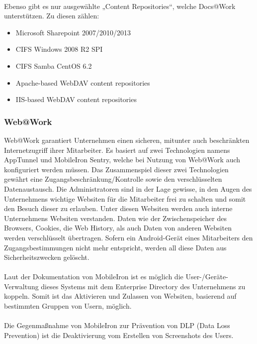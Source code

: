 \paragraph*{}
Ebenso gibt es nur ausgewählte „Content Repositories“, welche Docs@Work unterstützen. Zu diesen zählen:
\begin{itemize}
	\item Microsoft Sharepoint 2007/2010/2013
	\item CIFS Windows 2008 R2 SPI
	\item CIFS Samba CentOS 6.2
	\item Apache-based WebDAV content repositories
	\item IIS-based WebDAV content repositories
\end{itemize}

\subsubsection{Web@Work}
Web@Work garantiert Unternehmen einen sicheren, mitunter auch beschränkten Internetzugriff ihrer Mitarbeiter. Es basiert auf zwei Technologien namens AppTunnel und MobileIron Sentry, welche bei Nutzung von Web@Work auch konfiguriert werden müssen. Das Zusammenspiel dieser zwei Technologien gewährt eine Zugangsbeschränkung/Kontrolle sowie den verschlüsselten Datenaustausch. Die Administratoren sind in der Lage gewisse, in den Augen des Unternehmens wichtige Websiten für die Mitarbeiter frei zu schalten und somit den Besuch dieser zu erlauben. Unter diesen Websiten werden auch interne Unternehmens Websiten verstanden. Daten wie der Zwischenspeicher des Browsers, Cookies, die Web History, als auch Daten von anderen Websiten werden verschlüsselt übertragen. Sofern ein Android-Gerät eines Mitarbeiters den Zugangsbestimmungen nicht mehr entspricht, werden all diese Daten aus Sicherheitszwecken gelöscht.
\paragraph*{}
Laut der Dokumentation von MobileIron ist es möglich die User-/Geräte-Verwaltung dieses Systems mit dem Enterprise Directory des Unternehmens zu koppeln. Somit ist das Aktivieren und Zulassen von Websiten, basierend auf bestimmten Gruppen von Usern, möglich.
\paragraph*{}
Die Gegenmaßnahme von MobileIron zur Prävention von DLP (Data Loss Prevention) ist die Deaktivierung vom Erstellen von Screenshots des Users.
